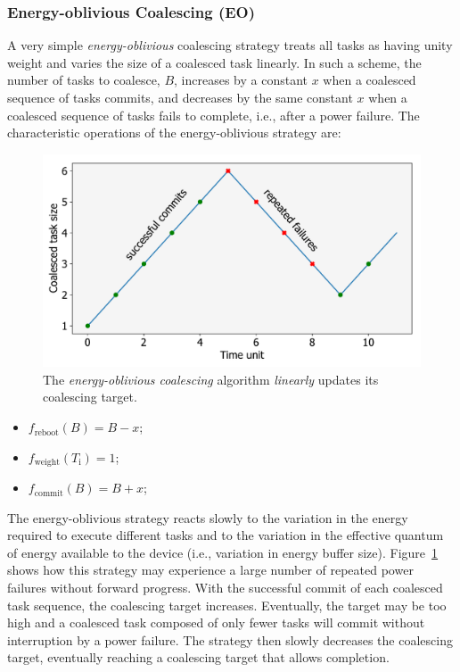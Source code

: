 \subsubsection{Energy-oblivious Coalescing (EO)}
\label{subsec:energyBlind}

A very simple {\em energy-oblivious} coalescing strategy treats all tasks as
having unity weight and varies the size of a coalesced task linearly. In such a
scheme, the number of tasks to coalesce, $B$, increases by a constant $x$ when
a coalesced sequence of tasks commits, and decreases by the same constant $x$
when a coalesced sequence of tasks fails to complete, i.e., after a power
failure. The characteristic operations of the energy-oblivious strategy are: 

\begin{figure}
	\centering
	\includegraphics[width=0.3\columnwidth]{figures/slowCoal}
	\caption{The {\em energy-oblivious coalescing} algorithm \emph{linearly} updates its coalescing target.}
	\label{fig:energyBlind}
\end{figure}

\begin{itemize}
\item $f_\text{reboot}(B) = B - x $;
\item $f_\text{weight}(T_\text{i}) =  1$; 
\item $f_\text{commit}(B) = B + x$; 
\end{itemize}

The energy-oblivious strategy reacts slowly to the variation in the energy
required to execute different tasks and to the variation in the effective quantum of
energy available to the device (i.e., variation in energy buffer size). 
%
Figure~\ref{fig:energyBlind} shows how this strategy may experience a 
large number of repeated power failures without forward progress.
%
With the successful commit of each coalesced task sequence, the coalescing
target increases.  Eventually, the target may be too high and a coalesced task
composed of only fewer tasks will commit without interruption by a power
failure.
%
The strategy then slowly decreases the coalescing target, eventually reaching a
coalescing target that allows completion.
%

